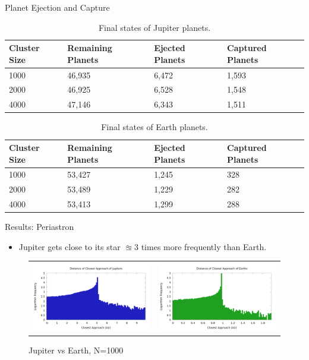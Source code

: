 \documentclass{beamer}
\begin{document}
\begin{frame}{Planet Ejection and Capture}
    \begin{table}[H]
        \centering
        \scriptsize
        \caption{Final states of Jupiter planets.}
        \begin{tabular}{|llll|}
            \hline
            \textbf{Cluster Size} & \textbf{Remaining Planets} & \textbf{Ejected Planets} & \textbf{Captured Planets} \\
            \hline
            1000 & 46,935 & 6,472 & 1,593 \\
            2000 & 46,925 & 6,528 & 1,548 \\
            4000 & 47,146 & 6,343 & 1,511 \\
            \hline
        \end{tabular}
    \end{table}
    \begin{table}[H]
        \centering
        \scriptsize
        \caption{Final states of Earth planets.}
        \begin{tabular}{|llll|}
            \hline
            \textbf{Cluster Size} & \textbf{Remaining Planets} & \textbf{Ejected Planets} & \textbf{Captured Planets} \\
            \hline
            1000 & 53,427 & 1,245 & 328 \\
            2000 & 53,489 & 1,229 & 282 \\
            4000 & 53,413 & 1,299 & 288 \\
            \hline
        \end{tabular}
    \end{table}
\end{frame}

\begin{frame}{Results: Periastron}
    \begin{itemize}
        \item Jupiter gets close to its star $\approxeq 3$ times more frequently than Earth.
    \end{itemize}
    \begin{figure}
        \centering
        \caption{Jupiter vs Earth, N=1000}
        \begin{tabular}{cc}
            \includegraphics[height=1.20in]{periastron_jupiter_1000.png} &
            \includegraphics[height=1.20in]{periastron_earth_1000.png}
        \end{tabular}
    \end{figure}
\end{frame}
\end{document}
